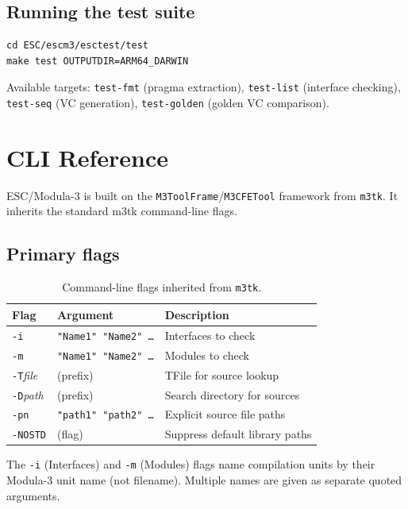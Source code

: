 \documentclass[11pt]{article}
\newcommand{\escm}{ESC/Modula-3}
\newcommand{\m}[1]{\texttt{#1}}
\begin{document}
\subsection{Running the test suite}

\begin{lstlisting}[language={}]
cd ESC/escm3/esctest/test
make test OUTPUTDIR=ARM64_DARWIN
\end{lstlisting}

Available targets: \m{test-fmt} (pragma extraction),
\m{test-list} (interface checking), \m{test-seq} (VC generation),
\m{test-golden} (golden VC comparison).

\section{CLI Reference}
\label{sec:cli}

\escm{} is built on the \m{M3ToolFrame}/\m{M3CFETool} framework from
\m{m3tk}.  It inherits the standard m3tk command-line flags.

\subsection{Primary flags}

\begin{table}[ht]
\centering
\begin{tabular}{@{}lll@{}}
\toprule
Flag & Argument & Description \\
\midrule
\m{-i} & \m{"Name1" "Name2" \ldots} & Interfaces to check \\
\m{-m} & \m{"Name1" "Name2" \ldots} & Modules to check \\
\m{-T}\emph{file} & (prefix) & TFile for source lookup \\
\m{-D}\emph{path} & (prefix) & Search directory for sources \\
\m{-pn} & \m{"path1" "path2" \ldots} & Explicit source file paths \\
\m{-NOSTD} & (flag) & Suppress default library paths \\
\bottomrule
\end{tabular}
\caption{Command-line flags inherited from \m{m3tk}.}
\label{tab:flags}
\end{table}

The \m{-i} (Interfaces) and \m{-m} (Modules) flags name compilation
units by their Modula-3 unit name (not filename).  Multiple names are
given as separate quoted arguments.
\end{document}
